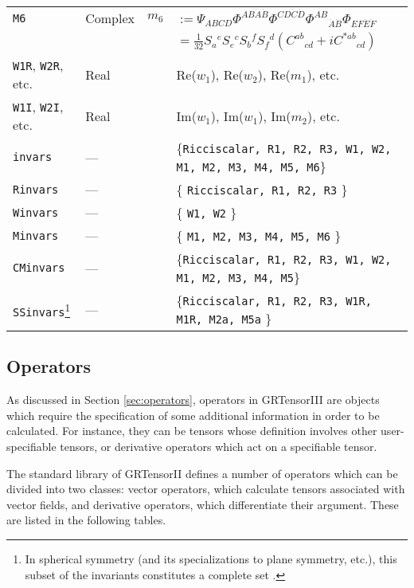\documentclass{article}
\begin{document}
{{{\begin{longtable}[c]{llrp{}}
\texttt{M6}	& Complex & $m_6$ & $:=	\Psi_{ABCD} \Phi^{AB\dot{A}\dot{B}}
				  \Phi^{CD\dot{C}\dot{D}}
				  \Phi^{AB}{}_{\dot{A}\dot{B}}
				  \Phi_{EF\dot{E}\dot{F}}$\\
		&	&	& $= \frac{1}{32} S_a{}^e S_e{}^c S_b{}^f
				  S_f{}^d (C^{ab}{}_{cd} + i C^{*ab}{}_{cd})$\\
\texttt{W1R}, \texttt{W2R}, etc. & Real & &
		Re($w_1$), Re($w_2$), Re($m_1$), etc. \\
\texttt{W1I}, \texttt{W2I}, etc. & Real & &
		Im($w_1$), Im($w_1$), Im($m_2$), etc. \\
\texttt{invars}	& ---	& & \{\texttt{Ricciscalar, R1, R2, R3, W1, W2, M1, M2,
			M3, M4, M5, M6}\} \\
\texttt{Rinvars} & ---	& & \{ \texttt{Ricciscalar, R1, R2, R3} \} \\
\texttt{Winvars} & ---	& & \{ \texttt{W1, W2} \} \\
\texttt{Minvars} & ---	& & \{ \texttt{M1, M2, M3, M4, M5, M6} \} \\
\texttt{CMinvars}& ---	& & \{\texttt{Ricciscalar, R1, R2, R3, W1, W2, M1,
			M2, M3, M4, M5}\} \\
\texttt{SSinvars}\footnote{In spherical symmetry (and its specializations to
  plane symmetry, etc.), 
  this subset of the invariants constitutes a complete set
  \cite{musgrave:1996}.}
                 & ---	& & \{\texttt{Ricciscalar, R1, R2, R3, W1R, M1R,
			M2a, M5a} \} \\
\hline
\end{longtable}
\renewcommand{\baselinestretch}{1}\normalsize
%
\subsection{Operators}
%
As discussed in Section \ref{sec:operators}, operators in GRTensorIII are
objects which require the specification of some additional information
in order to be calculated. For instance, they can be tensors whose 
definition involves other user-specifiable tensors, or derivative operators
which act on a specifiable tensor.

The standard library of GRTensorII
defines a number of operators which can be divided into two classes: vector
operators, which calculate tensors associated with vector fields, and
derivative operators, which differentiate their argument. These are listed
in the following tables.\\

}}}
\end{document}
